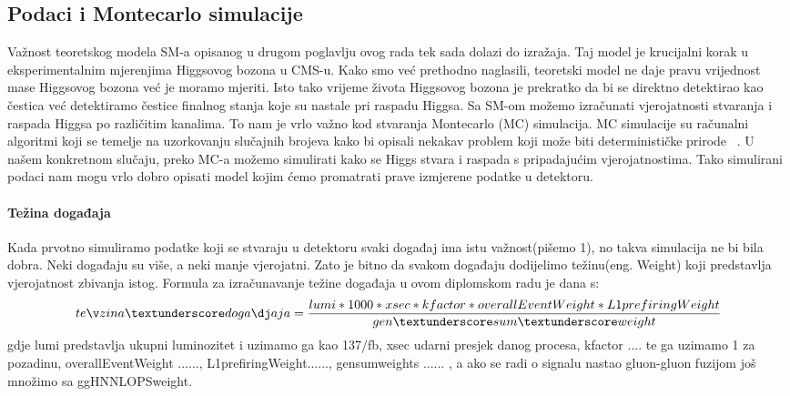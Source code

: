 \documentclass[12pt,a4paper,oneside]{article}
\begin{document}
\begin{linenumbers}
		\subsection{Podaci i Montecarlo simulacije}
		Važnost teoretskog modela SM-a opisanog u drugom poglavlju ovog rada tek sada dolazi do izražaja.  Taj model je krucijalni korak u eksperimentalnim mjerenjima Higgsovog bozona u CMS-u. Kako smo već prethodno naglasili, teoretski model ne daje pravu vrijednost mase Higgsovog bozona već je moramo mjeriti. Isto tako vrijeme života Higgsovog bozona je prekratko da bi se direktno detektirao kao čestica već detektiramo čestice finalnog stanja koje su nastale pri raspadu Higgsa. Sa SM-om možemo izračunati vjerojatnosti stvaranja i raspada Higgsa po različitim kanalima. To nam je vrlo važno kod stvaranja Montecarlo (MC) simulacija. MC simulacije su računalni algoritmi koji se temelje na uzorkovanju slučajnih brojeva kako bi opisali nekakav problem koji može biti determinističke prirode ~\cite{mc-simulacije}. U našem konkretnom slučaju, preko MC-a možemo simulirati kako se Higgs stvara i raspada s pripadajućim vjerojatnostima. Tako simulirani podaci nam mogu vrlo dobro opisati model kojim ćemo promatrati prave izmjerene podatke u detektoru.
		
		\paragraph{Težina događaja}
		Kada prvotno simuliramo podatke koji se stvaraju u detektoru svaki događaj ima istu važnost(pišemo 1), no takva simulacija ne bi bila dobra. Neki događaju su više, a neki manje vjerojatni. Zato je bitno da svakom događaju dodijelimo težinu(eng. Weight) koji predstavlja vjerojatnost zbivanja istog.
		Formula za izračunavanje težine događaja u ovom diplomskom radu je dana s:
		\begin{equation}
		težina\textunderscore događaja = \frac{lumi*1000*xsec*kfactor*overallEventWeight*L1prefiringWeight}{gen\textunderscore sum \textunderscore weight}
		\end{equation}
		gdje lumi predstavlja ukupni luminozitet i uzimamo ga kao 137/fb, xsec udarni presjek danog procesa, kfactor .... te ga uzimamo 1 za pozadinu, overallEventWeight ......, L1prefiringWeight......, gensumweights ...... , a ako se radi o signalu nastao gluon-gluon fuzijom još množimo sa ggHNNLOPSweight.
		

\end{linenumbers}
\end{document}
